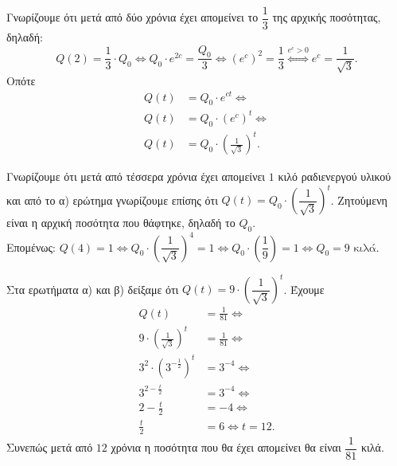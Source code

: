 \begin{alist}
\item Γνωρίζουμε ότι μετά από δύο χρόνια έχει απομείνει το $\dfrac{1}{3}$ της αρχικής ποσότητας, δηλαδή:
\[Q(2) = \frac{1}{3}\cdot Q_0 \Leftrightarrow Q_0\cdot e^{2c} = \frac{Q_0}{3} \Leftrightarrow (e^c)^2 = \frac{1}{3} \overset{e^c>0}{\iff} e^c = \frac{1}{\sqrt{3}}.\] 
Οπότε
\begin{align*}
Q(t) &= Q_0\cdot e^{ct} \Leftrightarrow \\
Q(t) &= Q_0\cdot(e^c)^t \Leftrightarrow \\
Q(t) &= Q_0\cdot\left(\frac{1}{\sqrt{3}}\right)^t.
\end{align*}
\item Γνωρίζουμε ότι μετά από τέσσερα χρόνια έχει απομείνει $1$ κιλό ραδιενεργού υλικού και από το α) ερώτημα γνωρίζουμε επίσης ότι $Q(t) = Q_0\cdot\left(\dfrac{1}{\sqrt{3}}\right)^t$. Ζητούμενη είναι η αρχική ποσότητα που θάφτηκε, δηλαδή το $Q_0$. \\
Επομένως: $Q(4) = 1 \Leftrightarrow Q_0\cdot\left(\dfrac{1}{\sqrt{3}}\right)^4 = 1 \Leftrightarrow Q_0\cdot\left(\dfrac{1}{9}\right) = 1 \Leftrightarrow Q_0 = 9 \text{ κιλά}$.
\item Στα ερωτήματα α) και β) δείξαμε ότι $Q(t) = 9\cdot\left(\dfrac{1}{\sqrt{3}}\right)^t$. Έχουμε
\begin{align*}
Q(t) &= \frac{1}{81} \Leftrightarrow \\
9\cdot\left(\frac{1}{\sqrt{3}}\right)^t &= \frac{1}{81} \Leftrightarrow \\
3^2\cdot\left(3^{-\frac{1}{2}}\right)^t &= 3^{-4} \Leftrightarrow \\
3^{2-\frac{t}{2}} &= 3^{-4} \Leftrightarrow \\
2-\frac{t}{2} &= -4 \Leftrightarrow \\
\frac{t}{2} &= 6 \Leftrightarrow t = 12.
\end{align*}
Συνεπώς μετά από $12$ χρόνια η ποσότητα που θα έχει απομείνει θα είναι $\dfrac{1}{81}$ κιλά.
\end{alist}

